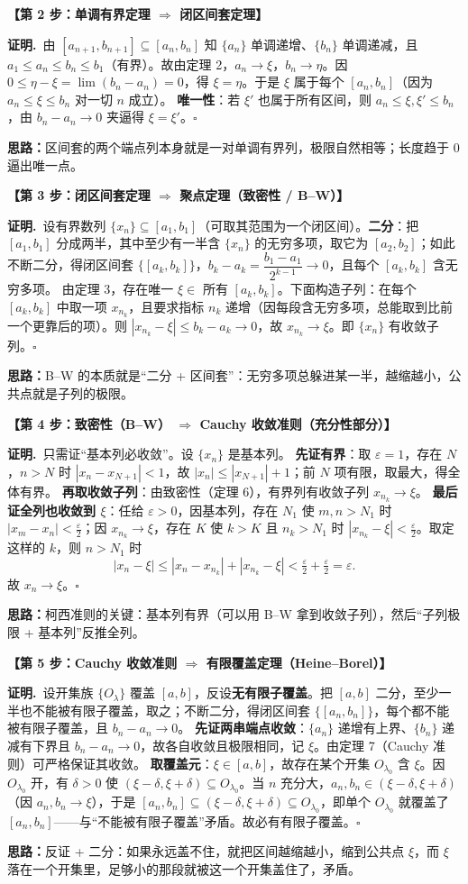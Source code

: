 \documentclass[11pt,a4paper,UTF8]{ctexart}
\newcommand{\eps}{\varepsilon}
\newcommand{\st}[1]{\par\medskip\noindent\colorbox{blue!10}{\parbox{\dimexpr\linewidth-2\fboxsep}{\textbf{【#1】}}}\par\smallskip}
\newcommand{\pf}{\par\smallskip\noindent\textbf{证明.}\ }
\newcommand{\qed}{\hfill$\square$}
\newcommand{\idea}[1]{\par\smallskip\noindent\colorbox{yellow!20}{\parbox{\dimexpr\linewidth-2\fboxsep}{\textbf{思路：}#1}}\par\smallskip}
\begin{document}
\st{第 2 步：单调有界定理 $\Rightarrow$ 闭区间套定理}
\pf 由 $[a_{n+1},b_{n+1}]\subseteq[a_n,b_n]$ 知 $\{a_n\}$ 单调递增、$\{b_n\}$ 单调递减，且 $a_1\le a_n\le b_n\le b_1$（有界）。故由定理 2，$a_n\to\xi$，$b_n\to\eta$。因 $0\le\eta-\xi=\lim(b_n-a_n)=0$，得 $\xi=\eta$。于是 $\xi$ 属于每个 $[a_n,b_n]$（因为 $a_n\le\xi\le b_n$ 对一切 $n$ 成立）。
\textbf{唯一性}：若 $\xi'$ 也属于所有区间，则 $a_n\le\xi,\xi'\le b_n$，由 $b_n-a_n\to0$ 夹逼得 $\xi=\xi'$。\qed
\idea{区间套的两个端点列本身就是一对单调有界列，极限自然相等；长度趋于 0 逼出唯一点。}

\st{第 3 步：闭区间套定理 $\Rightarrow$ 聚点定理（致密性 / B–W）}
\pf 设有界数列 $\{x_n\}\subseteq[a_1,b_1]$（可取其范围为一个闭区间）。\textbf{二分}：把 $[a_1,b_1]$ 分成两半，其中至少有一半含 $\{x_n\}$ 的无穷多项，取它为 $[a_2,b_2]$；如此不断二分，得闭区间套 $\{[a_k,b_k]\}$，$b_k-a_k=\dfrac{b_1-a_1}{2^{k-1}}\to0$，且每个 $[a_k,b_k]$ 含无穷多项。
由定理 3，存在唯一 $\xi\in$ 所有 $[a_k,b_k]$。下面构造子列：在每个 $[a_k,b_k]$ 中取一项 $x_{n_k}$，且要求指标 $n_k$ 递增（因每段含无穷多项，总能取到比前一个更靠后的项）。则 $|x_{n_k}-\xi|\le b_k-a_k\to0$，故 $x_{n_k}\to\xi$。即 $\{x_n\}$ 有收敛子列。\qed
\idea{B–W 的本质就是“二分 + 区间套”：无穷多项总躲进某一半，越缩越小，公共点就是子列的极限。}

\st{第 4 步：致密性（B–W） $\Rightarrow$ Cauchy 收敛准则（充分性部分）}
\pf 只需证“基本列必收敛”。设 $\{x_n\}$ 是基本列。
\textbf{先证有界}：取 $\eps=1$，存在 $N$，$n>N$ 时 $|x_n-x_{N+1}|<1$，故 $|x_n|\le|x_{N+1}|+1$；前 $N$ 项有限，取最大，得全体有界。
\textbf{再取收敛子列}：由致密性（定理 6），有界列有收敛子列 $x_{n_k}\to\xi$。
\textbf{最后证全列也收敛到 $\xi$}：任给 $\eps>0$，因基本列，存在 $N_1$ 使 $m,n>N_1$ 时 $|x_m-x_n|<\frac\eps2$；因 $x_{n_k}\to\xi$，存在 $K$ 使 $k>K$ 且 $n_k>N_1$ 时 $|x_{n_k}-\xi|<\frac\eps2$。取定这样的 $k$，则 $n>N_1$ 时
$$|x_n-\xi|\le|x_n-x_{n_k}|+|x_{n_k}-\xi|<\tfrac\eps2+\tfrac\eps2=\eps.$$
故 $x_n\to\xi$。\qed
\idea{柯西准则的关键：基本列有界（可以用 B–W 拿到收敛子列），然后“子列极限 + 基本列”反推全列。}

\st{第 5 步：Cauchy 收敛准则 $\Rightarrow$ 有限覆盖定理（Heine–Borel）}
\pf 设开集族 $\{O_\lambda\}$ 覆盖 $[a,b]$，反设\textbf{无有限子覆盖}。把 $[a,b]$ 二分，至少一半也不能被有限子覆盖，取之；不断二分，得闭区间套 $\{[a_n,b_n]\}$，每个都不能被有限子覆盖，且 $b_n-a_n\to0$。
\textbf{先证两串端点收敛}：$\{a_n\}$ 递增有上界、$\{b_n\}$ 递减有下界且 $b_n-a_n\to0$，故各自收敛且极限相同，记 $\xi$。由定理 7（Cauchy 准则）可严格保证其收敛。
\textbf{取覆盖元}：$\xi\in[a,b]$，故存在某个开集 $O_{\lambda_0}$ 含 $\xi$。因 $O_{\lambda_0}$ 开，有 $\delta>0$ 使 $(\xi-\delta,\xi+\delta)\subseteq O_{\lambda_0}$。当 $n$ 充分大，$a_n,b_n\in(\xi-\delta,\xi+\delta)$（因 $a_n,b_n\to\xi$），于是 $[a_n,b_n]\subseteq(\xi-\delta,\xi+\delta)\subseteq O_{\lambda_0}$，即单个 $O_{\lambda_0}$ 就覆盖了 $[a_n,b_n]$——与“不能被有限子覆盖”矛盾。故必有有限子覆盖。\qed
\idea{反证 + 二分：如果永远盖不住，就把区间越缩越小，缩到公共点 $\xi$，而 $\xi$ 落在一个开集里，足够小的那段就被这一个开集盖住了，矛盾。}
\end{document}

